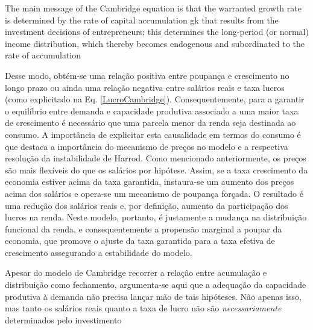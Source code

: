 \begin{citacao}
The main message of the Cambridge
equation is that the warranted growth rate is determined by the rate of capital
accumulation gk that results from the investment decisions of entrepreneurs; this
determines the long-period (or normal) income distribution, which thereby
becomes endogenous and subordinated to the rate of accumulation \cite[p.~158]{cesaratto_neo-kaleckian_2015}
\end{citacao}
Desse modo, obtém-se uma relação positiva entre poupança e crescimento no longo prazo ou ainda uma relação negativa entre salários reais e taxa lucros (como explicitado na Eq. \ref{LucroCambridge}). Consequentemente, para a garantir o equilíbrio entre demanda e capacidade produtiva associado a uma maior taxa de crescimento é necessário que uma parcela menor da renda seja destinada ao consumo. A importância de explicitar esta causalidade em termos do consumo é que destaca a importância do mecanismo de preços no modelo e a respectiva resolução da instabilidade de Harrod. Como mencionado anteriormente, os preços são mais flexíveis do que os salários por hipótese. Assim, se a taxa crescimento da economia estiver acima da taxa garantida, instaura-se um aumento dos preços acima dos salários e opera-se um mecanismo de poupança forçada. O resultado é uma redução dos salários reais e, por definição, aumento da participação dos lucros na renda.  Neste modelo, portanto, é justamente a mudança na distribuição funcional da renda, e consequentemente a propensão marginal a poupar da economia, que promove o ajuste da taxa garantida para a taxa efetiva de crescimento assegurando a estabilidade do modelo.

Apesar do modelo de Cambridge recorrer a relação entre acumulação e distribuição como fechamento, argumenta-se aqui que a adequação da capacidade
produtiva à demanda não precisa lançar mão de tais hipóteses.
Não apenas isso, mas tanto os salários reais quanto a taxa de lucro não são \textit{necessariamente} determinados pelo investimento

